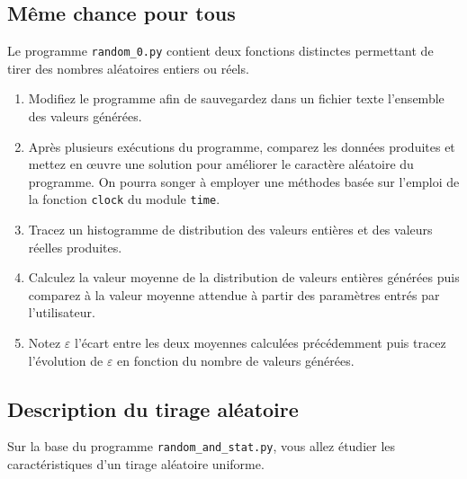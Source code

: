 \subsection{Même chance pour tous}

Le programme \texttt{random\_0.py}  contient deux fonctions distinctes
permettant de tirer des nombres aléatoires entiers ou réels.

\begin{enumerate}
\item Modifiez le programme afin  de sauvegardez dans un fichier texte
  l'ensemble des valeurs générées.

\item Après  plusieurs exécutions  du programme, comparez  les données
  produites  et mettez  en \oe  uvre  une solution  pour améliorer  le
  caractère aléatoire du programme. On pourra songer à employer    une 
  méthodes basée sur l'emploi  de la fonction \texttt{clock} du module 
  \texttt{time}.
  
\item Tracez  un histogramme de  distribution des valeurs  entières et
  des valeurs réelles produites.

\item  Calculez  la  valeur  moyenne de  la  distribution  de  valeurs
  entières  générées puis  comparez  à la  valeur  moyenne attendue  à
  partir des paramètres entrés par l'utilisateur.

\item Notez  $\varepsilon$ l'écart  entre les deux  moyennes calculées
  précédemment puis tracez l'évolution de $\varepsilon$ en fonction du
  nombre de valeurs générées.

\end{enumerate}


\subsection{Description du tirage aléatoire}

Sur  la base  du programme  \texttt{random\_and\_stat.py}, vous  allez
étudier les caractéristiques d'un tirage aléatoire uniforme.


